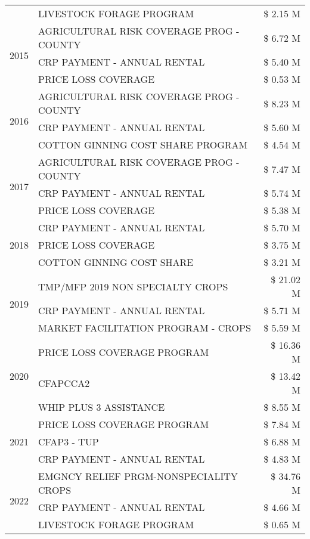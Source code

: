 \begin{tabular}{llr}
 & LIVESTOCK FORAGE PROGRAM & \$ 2.15 M \\
\cline{1-3}
\multirow[t]{3}{*}{2015} & AGRICULTURAL RISK COVERAGE PROG - COUNTY & \$ 6.72 M \\
 & CRP PAYMENT - ANNUAL RENTAL & \$ 5.40 M \\
 & PRICE LOSS COVERAGE & \$ 0.53 M \\
\cline{1-3}
\multirow[t]{3}{*}{2016} & AGRICULTURAL RISK COVERAGE PROG - COUNTY & \$ 8.23 M \\
 & CRP PAYMENT - ANNUAL RENTAL & \$ 5.60 M \\
 & COTTON GINNING COST SHARE PROGRAM & \$ 4.54 M \\
\cline{1-3}
\multirow[t]{3}{*}{2017} & AGRICULTURAL RISK COVERAGE PROG - COUNTY & \$ 7.47 M \\
 & CRP PAYMENT - ANNUAL RENTAL & \$ 5.74 M \\
 & PRICE LOSS COVERAGE & \$ 5.38 M \\
\cline{1-3}
\multirow[t]{3}{*}{2018} & CRP PAYMENT - ANNUAL RENTAL & \$ 5.70 M \\
 & PRICE LOSS COVERAGE & \$ 3.75 M \\
 & COTTON GINNING COST SHARE & \$ 3.21 M \\
\cline{1-3}
\multirow[t]{3}{*}{2019} & TMP/MFP 2019 NON SPECIALTY CROPS & \$ 21.02 M \\
 & CRP PAYMENT - ANNUAL RENTAL & \$ 5.71 M \\
 & MARKET FACILITATION PROGRAM - CROPS & \$ 5.59 M \\
\cline{1-3}
\multirow[t]{3}{*}{2020} & PRICE LOSS COVERAGE PROGRAM & \$ 16.36 M \\
 & CFAPCCA2 & \$ 13.42 M \\
 & WHIP PLUS 3 ASSISTANCE & \$ 8.55 M \\
\cline{1-3}
\multirow[t]{3}{*}{2021} & PRICE LOSS COVERAGE PROGRAM & \$ 7.84 M \\
 & CFAP3 - TUP & \$ 6.88 M \\
 & CRP PAYMENT - ANNUAL RENTAL & \$ 4.83 M \\
\cline{1-3}
\multirow[t]{3}{*}{2022} & EMGNCY RELIEF PRGM-NONSPECIALITY CROPS & \$ 34.76 M \\
 & CRP PAYMENT - ANNUAL RENTAL & \$ 4.66 M \\
 & LIVESTOCK FORAGE PROGRAM & \$ 0.65 M \\
\cline{1-3}
\bottomrule
\end{tabular}
